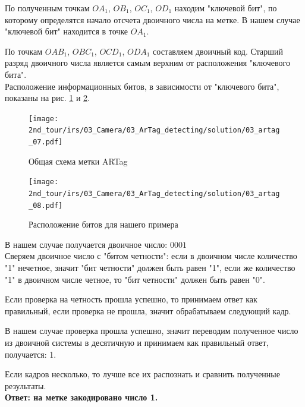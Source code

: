 По полученным точкам $OA_1$, $OB_1$, $OC_1$, $OD_1$ находим "ключевой бит", по которому определятся начало отсчета двоичного числа на метке. В нашем случае "ключевой бит" находится в точке $OA_1$.

По точкам $OAB_1$, $OBC_1$, $OCD_1$, $ODA_1$ составляем двоичный код. Старший разряд двоичного числа является самым верхним от расположения "ключевого бита". 
\\

Расположение информационных битов, в зависимости от "ключевого бита", показаны на рис. \ref{fig:03_artag_07} и \ref{fig:03_artag_08}.
\begin{figure}[h!]
	\centering
	\texttt{[image: 2nd\_tour/irs/03\_Camera/03\_ArTag\_detecting/solution/03\_artag\_07.pdf]}
	\label{fig:03_artag_07}
	\caption{Общая схема метки ARTag}
\end{figure}

\begin{figure}[h!]
	\centering
	\texttt{[image: 2nd\_tour/irs/03\_Camera/03\_ArTag\_detecting/solution/03\_artag\_08.pdf]}
	\label{fig:03_artag_08}
	\caption{Расположение битов для нашего примера}
\end{figure}

В нашем случае получается двоичное число: $0001$ \\
Сверяем двоичное число с "битом четности": если в двоичном числе количество "1" нечетное, значит "бит четности" должен быть равен "1", если же количество "1" в двоичном числе четное, то "бит четности" должен быть равен "0".

Если проверка на четность прошла успешно, то принимаем ответ как правильный, если проверка не прошла, значит обрабатываем следующий кадр.

В нашем случае проверка прошла успешно, значит переводим полученное число из двоичной системы в десятичную и принимаем как правильный ответ, получается: 1.

Если кадров несколько, то лучше все их распознать и сравнить полученные результаты.
\\

\textbf{Ответ: на метке закодировано число 1.}

\codeExample

